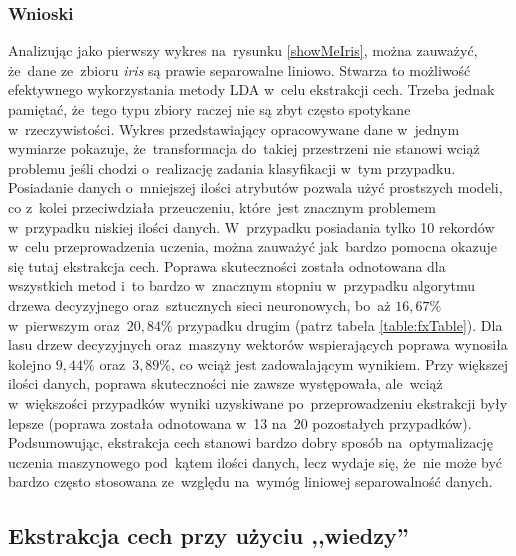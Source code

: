 \subsubsection{Wnioski}
Analizując jako pierwszy wykres na~rysunku \ref{showMeIris}, można zauważyć, że~dane ze~zbioru \textit{iris} są prawie separowalne liniowo. Stwarza to możliwość efektywnego wykorzystania metody LDA w~celu ekstrakcji cech. Trzeba jednak pamiętać, że~tego typu zbiory raczej nie są zbyt często spotykane w~rzeczywistości. Wykres przedstawiający opracowywane dane w~jednym wymiarze pokazuje, że~transformacja do~takiej przestrzeni nie stanowi wciąż problemu jeśli chodzi o~realizację zadania klasyfikacji w~tym przypadku. Posiadanie danych o~mniejszej ilości atrybutów pozwala użyć prostszych modeli, co z~kolei przeciwdziała przeuczeniu, które~jest znacznym problemem w~przypadku niskiej ilości danych. W~przypadku posiadania tylko 10 rekordów w~celu przeprowadzenia uczenia, można zauważyć jak~bardzo pomocna okazuje się tutaj ekstrakcja cech. Poprawa skuteczności została odnotowana dla wszystkich metod i~to bardzo w~znacznym stopniu w~przypadku algorytmu drzewa decyzyjnego oraz~sztucznych sieci neuronowych, bo~aż $16,67 \%$ w~pierwszym oraz~$20,84 \%$ przypadku drugim (patrz tabela \ref{table:fxTable}). Dla lasu drzew decyzyjnych oraz~maszyny wektorów wspierających poprawa wynosiła kolejno $9,44 \%$ oraz~$3,89 \%$, co wciąż jest zadowalającym wynikiem. Przy większej ilości danych, poprawa skuteczności nie zawsze występowała, ale~wciąż w~większości przypadków wyniki uzyskiwane po~przeprowadzeniu ekstrakcji były lepsze (poprawa została odnotowana w~13 na~20 pozostałych przypadków). Podsumowując, ekstrakcja cech stanowi bardzo dobry sposób na~optymalizację uczenia maszynowego pod~kątem ilości danych, lecz wydaje się, że~nie może być bardzo często stosowana ze~względu na~wymóg liniowej separowalność danych.

\subsection{Ekstrakcja cech przy użyciu ,,wiedzy''}
